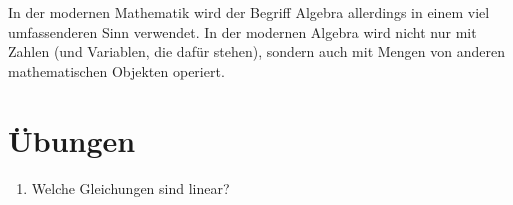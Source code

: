 \documentclass[%
11pt,%
twoside,%
titlepage,%
german,%
]{scrartcl}
\begin{document}
In der modernen Mathematik wird der Begriff Algebra allerdings in einem viel umfassenderen Sinn verwendet. In der modernen Algebra wird nicht nur mit Zahlen (und Variablen, die daf\"ur stehen), sondern auch mit Mengen von anderen mathematischen Objekten operiert.


\section*{Übungen}

\begin{enumerate}
\item \label{aufg:lingl:lingl} Welche Gleichungen sind linear?

\begin{minipage}{0.5\textwidth}
  \end{minipage}
  \begin{minipage}{0.5\textwidth}
  \end{minipage}


\end{enumerate}
\end{document}
